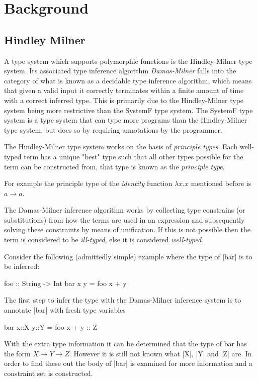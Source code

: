 \chapter{Background}
\section{Hindley Milner}
A type system which supports polymorphic functions is the Hindley-Milner\cite{HM} type system. Its associated type inference algorithm \emph{Damas-Milner} falls into the category of what is known as a decidable type inference algorithm, which means that given a valid input it correctly terminates within a finite amount of time with a correct inferred type. This is primarily due to the Hindley-Milner type system being more restrictive than the SystemF type system. The SystemF type system is a type system that can type more programs than the Hindley-Milner type system, but does so by requiring annotations by the programmer.

The Hindley-Milner type system works on the basis of \textit{principle types}. Each well-typed term has a unique "best" type such that all other types possible for the term can be constructed from, that type is known as the \textit{principle type}. 

For example the principle type of the \textit{identity} function $\lambda x.x$ mentioned before is $a \rightarrow a$.

The Damas-Milner inference algorithm works by collecting type constrains (or substitutions) from how the terms are used in an expression and subsequently solving these constraints by means of unification. If this is not possible then the term is considered to be \textit{ill-typed}, else it is considered \textit{well-typed}.

Consider the following (admittedly simple) example where the type of |bar| is to be inferred:
\begin{code}
foo :: String -> Int
bar x y = foo x + y
\end{code}

The first step to infer the type with the Damas-Milner inference system is to annotate |bar| with fresh type variables 
\begin{code}
bar x::X y::Y = foo x + y :: Z
\end{code}

With the extra type information it can be determined that the type of bar has the form $X \rightarrow Y \rightarrow Z$. However it is still not known what |X|, |Y| and |Z| are. In order to find these out the body of |bar| is examined for more information and a constraint set is constructed.

